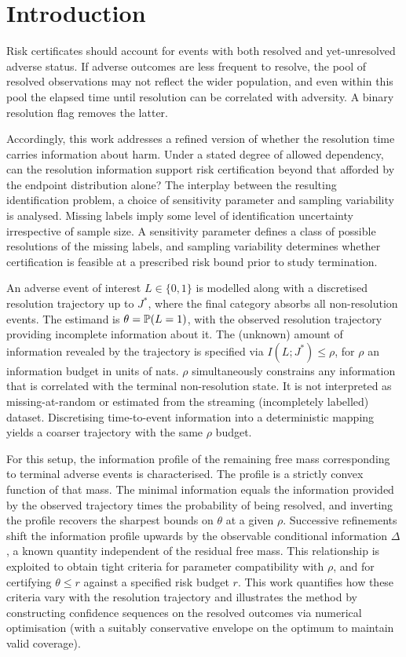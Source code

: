 \section{Introduction}\label{sec:intro} 
Risk certificates should account for events with both resolved and yet-unresolved adverse status. If adverse outcomes are less frequent to resolve, the pool of resolved observations may not reflect the wider population, and even within this pool the elapsed time until resolution can be correlated with adversity. A binary resolution flag removes the latter. 

Accordingly, this work addresses a refined version of whether the resolution time carries information about harm. Under a stated degree of allowed dependency, can the resolution information support risk certification beyond that afforded by the endpoint distribution alone? The interplay between the resulting identification problem, a choice of sensitivity parameter and sampling variability is analysed. Missing labels imply some level of identification uncertainty irrespective of sample size. A sensitivity parameter defines a class of possible resolutions of the missing labels, and sampling variability determines whether certification is feasible at a prescribed risk bound prior to study termination.

An adverse event of interest $L\in\{0,1\}$ is modelled along with a discretised resolution trajectory up to $J^*$, where the final category absorbs all non-resolution events. The estimand is $\theta = \mathbb P(L = 1)$, with the observed resolution trajectory providing incomplete information about it. The (unknown) amount of information revealed by the trajectory is specified via $I(L; J^*) \leq \rho$, for $\rho$ an information budget in units of nats. $\rho$ simultaneously constrains any information that is correlated with the terminal non-resolution state. It is not interpreted as missing-at-random or estimated from the streaming (incompletely labelled) dataset. Discretising time-to-event information into a deterministic mapping yields a coarser trajectory with the same $\rho$ budget.

For this setup, the information profile of the remaining free mass corresponding to terminal adverse events is characterised. The profile is a strictly convex function of that mass. The minimal information equals the information provided by the observed trajectory times the probability of being resolved, and inverting the profile recovers the sharpest bounds on $\theta$ at a given $\rho$. Successive refinements shift the information profile upwards by the observable conditional information $\Delta$, a known quantity independent of the residual free mass. This relationship is exploited to obtain tight criteria for parameter compatibility with $\rho$, and for certifying $\theta \leq r$ against a specified risk budget $r$. This work quantifies how these criteria vary with the resolution trajectory and illustrates the method by constructing confidence sequences on the resolved outcomes via numerical optimisation (with a suitably conservative envelope on the optimum to maintain valid coverage).

